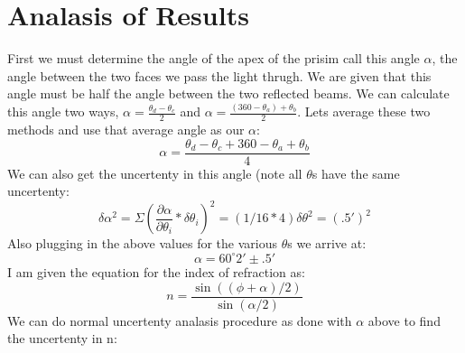 \documentclass[12pt,a4paper]{article}
\begin{document}
\section{Analasis of Results}
First we must determine the angle of the apex of the prisim call this angle $\alpha$, the angle between the two faces we pass the light thrugh.  We are given that this angle must be half the angle between the two reflected beams.  We can calculate this angle two ways, $\alpha=\frac{\theta_d-\theta_c}{2}$ and $\alpha=\frac{(360-\theta_a)+\theta_b}{2}$.  Lets average these two methods and use that average angle as our $\alpha$:
\[\alpha=\frac{\theta_d-\theta_c+360-\theta_a+\theta_b}{4}\]
We can also get the uncertenty in this angle (note all $\theta$s have the same uncertenty:
\[\delta\alpha^2=\Sigma(\frac{\partial\alpha}{\partial\theta_i}*\delta\theta_i)^2=(1/16*4)\delta\theta^2=(.5')^2\]
Also plugging in the above values for the various $\theta$s we arrive at:
\[\alpha=60^\circ 2'\pm .5'\]
I am given the equation for the index of refraction as:
\[n=\frac{\sin((\phi+\alpha)/2)}{\sin(\alpha/2)}\]
We can do normal uncertenty analasis procedure as done with $\alpha$ above to find the uncertenty in n:
\[\]
\end{document}
